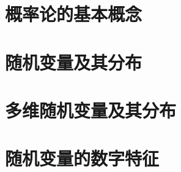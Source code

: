 \documentclass{article}
\begin{document}
  \tableofcontents
  \newpage

  \section{概率论的基本概念}
    
  \section{随机变量及其分布}
    
  \section{多维随机变量及其分布}
    
  \section{随机变量的数字特征}
    
\end{document}
